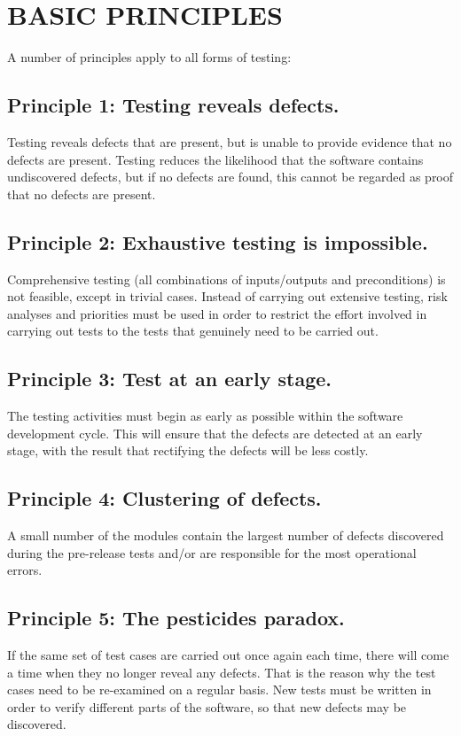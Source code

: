 \documentclass[12pt]{article}
\begin{document}
\section{BASIC PRINCIPLES}
A number of principles apply to all forms of testing: \newline
 \subsection{Principle 1: Testing reveals defects.}
Testing reveals defects that are present, but is unable to provide evidence that no defects are present. Testing reduces the likelihood that the software contains undiscovered defects, but if no defects are found, this cannot be regarded as proof that no defects are present. \newline
 \subsection{Principle 2: Exhaustive testing is impossible.}
Comprehensive  testing  (all  combinations  of  inputs/outputs  and  preconditions)  is  not feasible, except in trivial cases. Instead of carrying out extensive testing, risk analyses and priorities must be used in  order to  restrict the effort involved in  carrying out  tests to the tests that genuinely need to be carried out.  \newline
 \subsection{Principle 3: Test at an early stage. }
The  testing  activities  must  begin  as  early  as  possible  within  the  software  development cycle. This will ensure that the defects are detected at an early stage, with the result that rectifying the defects will be less costly. \newline
 \subsection{Principle 4: Clustering of defects. }
A small number of the modules contain the largest number of defects discovered during the pre-release tests and/or are responsible for the most operational errors. \newline
  \subsection{Principle 5: The pesticides paradox. }
If the same set of test cases are carried out once again each time, there will come a time when they no longer reveal any defects. That is the reason why the test cases need to be re-examined on a regular basis. New tests must be written in order to verify different parts of the software, so that new defects may be discovered. \newline
\end{document}
